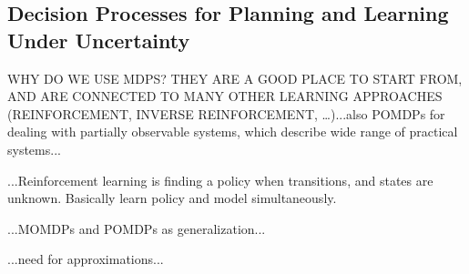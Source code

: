 \subsection{Decision Processes for Planning and Learning Under Uncertainty}
WHY DO WE USE MDPS? THEY ARE A GOOD PLACE TO START FROM, AND ARE CONNECTED TO MANY OTHER LEARNING APPROACHES (REINFORCEMENT, INVERSE REINFORCEMENT, \ldots)...also POMDPs for dealing with partially observable systems, which describe wide range of practical systems... 


...Reinforcement learning is finding a policy when transitions, and states are unknown. Basically learn policy and model simultaneously. %

...MOMDPs and POMDPs as generalization...

...need for approximations...


